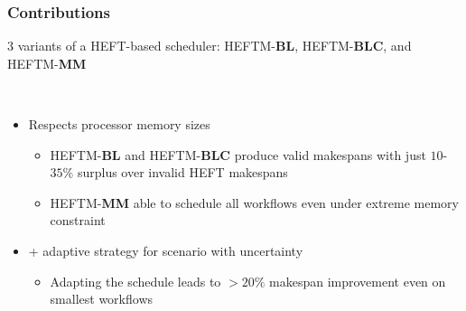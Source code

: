 \documentclass[xcolor=svgnames,titlepage,english,presentation]{beamer}
\begin{document}
\begin{frame}[t]
\begin{columns}
{\begin{figure}
        \end{figure}
    }
   
\end{columns}
   


\end{frame}


\begin{frame}[t]
    \frametitle{Contributions}

    3 variants of a HEFT-based scheduler: HEFTM-\textbf{BL}, HEFTM-\textbf{BLC}, and HEFTM-\textbf{MM}

    \pause
    ~~~~~~~~~~~~~~~~~

    
    \begin{itemize}
        \item Respects processor memory sizes
        \begin{itemize}
            \item HEFTM-\textbf{BL} and HEFTM-\textbf{BLC} produce valid makespans with just $10$-$35\%$ surplus over invalid HEFT makespans
            \item HEFTM-\textbf{MM} able to schedule all workflows even under extreme memory constraint
        \end{itemize}

        \pause

        \item + adaptive strategy for scenario with uncertainty          

        \begin{itemize}
            \item Adapting the schedule leads to $>20\%$ makespan improvement even on smallest workflows
        \end{itemize}
    
    \end{itemize}

    
    

\end{frame}
\end{document}
